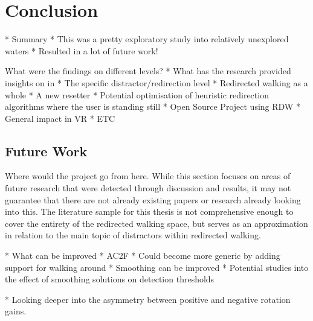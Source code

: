 \chapter{Conclusion}\label{chap:conclusion}
* Summary
* This was a pretty exploratory study into relatively unexplored waters
   * Resulted in a lot of future work!

What were the findings on different levels?
   * What has the research provided insights on in
      * The specific distractor/redirection level
      * Redirected walking as a whole
         * A new resetter
         * Potential optimisation of heuristic redirection algorithms where the user is standing still
         * Open Source Project using RDW
      * General impact in VR
      * ETC


\section{Future Work}\label{sec:futurework}
Where would the project go from here. While this section focuses on areas of future research that were detected through discussion and results, it may not guarantee that there are not already existing papers or research already looking into this. The literature sample for this thesis is not comprehensive enough to cover the entirety of the redirected walking space, but serves as an approximation in relation to the main topic of distractors within redirected walking. 

* What can be improved
* AC2F
   * Could become more generic by adding support for walking around
   * Smoothing can be improved
   * Potential studies into the effect of smoothing solutions on detection thresholds

* Looking deeper into the asymmetry between positive and negative rotation gains. 

